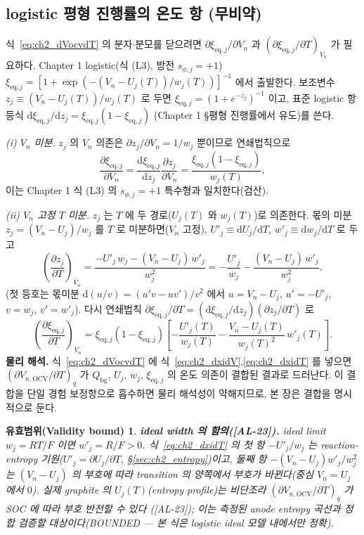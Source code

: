 \documentclass[11pt,a4paper]{article}
\newtheorem*{boundbox}{유효범위(Validity bound)}
\newcommand{\dd}{\mathrm{d}}
\newcommand{\eq}{\mathrm{eq}}
\newcommand{\bg}{\mathrm{bg}}
\newcommand{\OCV}{\mathrm{OCV}}
\newcommand{\AL}[1]{\textsf{[AL-#1]}}
\begin{document}
\subsection{logistic 평형 진행률의 온도 항 (무비약)}\label{sec:ch2_ocvT_logistic}
식~\eqref{eq:ch2_dVocvdT} 의 분자$\cdot$분모를 닫으려면 $\partial\xi_{\eq,j}/\partial V_n$ 과
$(\partial\xi_{\eq,j}/\partial T)_{V_n}$ 가 필요하다. Chapter 1 logistic(식 (L3), 방전 $s_{\phi,j}=+1$)
$\xi_{\eq,j}=[1+\exp(-(V_n-U_j(T))/w_j(T))]^{-1}$ 에서 출발한다. 보조변수 $z_j\equiv(V_n-U_j(T))/w_j(T)$ 로 두면
$\xi_{\eq,j}=(1+e^{-z_j})^{-1}$ 이고, 표준 logistic 항등식 $\dd\xi_{\eq,j}/\dd z_j=\xi_{\eq,j}(1-\xi_{\eq,j})$
(Chapter 1 \S 평형 진행률에서 유도)를 쓴다.

\emph{(i) $V_n$ 미분.} $z_j$ 의 $V_n$ 의존은 $\partial z_j/\partial V_n=1/w_j$ 뿐이므로 연쇄법칙으로
\begin{equation}
\frac{\partial\xi_{\eq,j}}{\partial V_n}=\frac{\dd\xi_{\eq,j}}{\dd z_j}\frac{\partial z_j}{\partial V_n}
=\frac{\xi_{\eq,j}(1-\xi_{\eq,j})}{w_j(T)},
\label{eq:ch2_dxidV}
\end{equation}
이는 Chapter 1 식 (L3) 의 $s_{\phi,j}=+1$ 특수형과 일치한다(검산).

\emph{(ii) $V_n$ 고정 $T$ 미분.} $z_j$ 는 $T$ 에 두 경로($U_j(T)$ 와 $w_j(T)$)로 의존한다. 몫의 미분
$z_j=(V_n-U_j)/w_j$ 를 $T$ 로 미분하면($V_n$ 고정), $U'_j\equiv\dd U_j/\dd T$, $w'_j\equiv\dd w_j/\dd T$ 로
두고
\begin{equation}
\left(\frac{\partial z_j}{\partial T}\right)_{V_n}=\frac{-U'_j\,w_j-(V_n-U_j)\,w'_j}{w_j^2}
=-\frac{U'_j}{w_j}-\frac{(V_n-U_j)\,w'_j}{w_j^2},
\label{eq:ch2_dzdT}
\end{equation}
(첫 등호는 몫미분 $\dd(u/v)=(u'v-uv')/v^2$ 에서 $u=V_n-U_j$, $u'=-U'_j$, $v=w_j$, $v'=w'_j$). 다시 연쇄법칙
$\partial\xi_{\eq,j}/\partial T=(\dd\xi_{\eq,j}/\dd z_j)(\partial z_j/\partial T)$ 로
\begin{equation}
\left(\frac{\partial\xi_{\eq,j}}{\partial T}\right)_{V_n}
=\xi_{\eq,j}(1-\xi_{\eq,j})\left[-\frac{U'_j(T)}{w_j(T)}-\frac{V_n-U_j(T)}{w_j(T)^2}\,w'_j(T)\right].
\label{eq:ch2_dxidT}
\end{equation}
\textbf{물리 해석.} 식~\eqref{eq:ch2_dVocvdT} 에 식~\eqref{eq:ch2_dxidV},\eqref{eq:ch2_dxidT} 를 넣으면
$(\partial V_{n,\OCV}/\partial T)_q$ 가 $Q_\bg$, $U_j$, $w_j$, $\xi_{\eq,j}$ 의 온도 의존이 결합된 결과로
드러난다. 이 결합을 단일 경험 보정항으로 흡수하면 물리 해석성이 약해지므로, 본 장은 결합을 명시적으로 둔다.
\begin{boundbox}
\textbf{ideal width 의 함의(\AL{23}).} ideal limit $w_j=RT/F$ 이면 $w'_j=R/F>0$. 식~\eqref{eq:ch2_dxidT} 의
첫 항 $-U'_j/w_j$ 는 reaction-entropy 기원($U'_j=\partial U_j/\partial T$, \S\ref{sec:ch2_entropy})이고, 둘째
항 $-(V_n-U_j)w'_j/w_j^2$ 는 $(V_n-U_j)$ 의 부호에 따라 transition 의 양쪽에서 부호가 바뀐다(중심 $V_n=U_j$
에서 $0$). 실제 graphite 의 $U_j(T)$(entropy profile)는 비단조라 $(\partial V_{n,\OCV}/\partial T)_q$ 가
SOC 에 따라 부호 반전할 수 있다 \cite{reynier2004,thomasnewman2003}(\AL{23}); 이는 측정된 anode entropy
곡선과 정합 검증할 대상이다(BOUNDED — 본 식은 logistic ideal 모델 내에서만 정확).
\end{boundbox}
\end{document}

